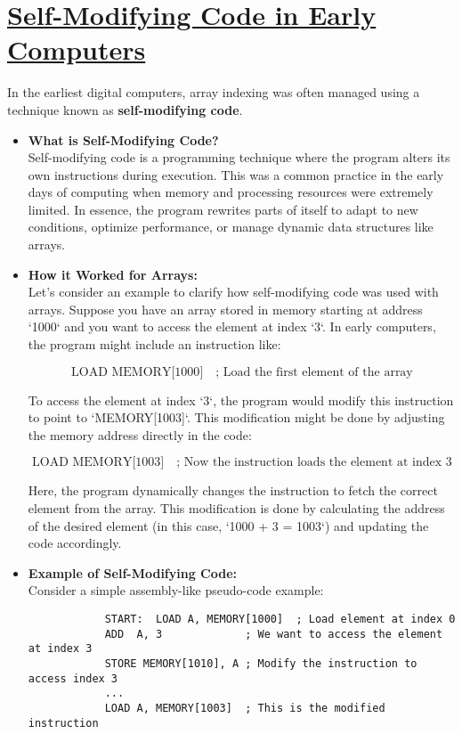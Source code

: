 \documentclass{book}
\begin{document}
	\section{\href{https://en.wikipedia.org/wiki/Self-modifying_code}{Self-Modifying Code in Early Computers}}
	
	In the earliest digital computers, array indexing was often managed using a technique known as \textbf{self-modifying code}.
	
	\begin{itemize}
		\item \textbf{What is Self-Modifying Code?} \\
		Self-modifying code is a programming technique where the program alters its own instructions during execution. This was a common practice in the early days of computing when memory and processing resources were extremely limited. In essence, the program rewrites parts of itself to adapt to new conditions, optimize performance, or manage dynamic data structures like arrays.
		
		\item \textbf{How it Worked for Arrays:} \\
		Let's consider an example to clarify how self-modifying code was used with arrays. Suppose you have an array stored in memory starting at address `1000` and you want to access the element at index `3`. In early computers, the program might include an instruction like:
		
		\[
		\text{LOAD } \text{MEMORY[1000]} \quad \text{; Load the first element of the array}
		\]
		
		To access the element at index `3`, the program would modify this instruction to point to `MEMORY[1003]`. This modification might be done by adjusting the memory address directly in the code:
		
		\[
		\text{LOAD } \text{MEMORY[1003]} \quad \text{; Now the instruction loads the element at index 3}
		\]
		
		Here, the program dynamically changes the instruction to fetch the correct element from the array. This modification is done by calculating the address of the desired element (in this case, `1000 + 3 = 1003`) and updating the code accordingly.
		
		\item \textbf{Example of Self-Modifying Code:} \\
		Consider a simple assembly-like pseudo-code example:
		\begin{verbatim}
			START:  LOAD A, MEMORY[1000]  ; Load element at index 0
			ADD  A, 3             ; We want to access the element at index 3
			STORE MEMORY[1010], A ; Modify the instruction to access index 3
			...
			LOAD A, MEMORY[1003]  ; This is the modified instruction
		\end{verbatim}
		

\end{itemize}
\end{document}
